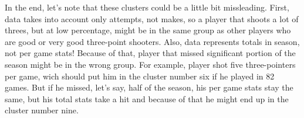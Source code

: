 \documentclass[a4paper]{article}
\begin{document}
In the end, let's note that these clusters could be a little bit missleading. First, data takes into account only attempts, not makes, so a player that shoots a lot of threes, but at low percentage, might be in the same group as other players who are good or very good three-point shooters. Also, data represents totals in season, not per game stats! Because of that, player that missed significant portion of the season might be in the wrong group. For example, player shot five three-pointers per game, wich should put him in the cluster number six if he played in 82 games. But if he missed, let's say, half of the season, his per game stats stay the same, but his total stats take a hit and because of that he might end up in the cluster number nine.

\pagebreak

\appendix


\appendix
\end{document}
